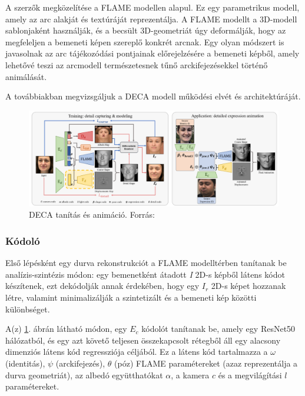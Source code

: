 \documentclass[12pt,a4]{article}
\begin{document}
            A szerzők megközelítése a FLAME modellen alapul. Ez egy parametrikus modell, amely az arc alakját és textúráját reprezentálja. A FLAME modellt a 3D-modell sablonjaként használják, és a becsült 3D-geometriát úgy deformálják, hogy az megfeleljen a bemeneti képen szereplő konkrét arcnak. Egy olyan módszert is javasolnak az arc tájékozódási pontjainak előrejelzésére a bemeneti képből, amely lehetővé teszi az arcmodell természetesnek tűnő arckifejezésekkel történő animálását.
    
        
     	      A továbbiakban megvizsgáljuk a DECA modell működési elvét és architektúráját.

            \begin{figure}[h]	
     		 \centering
     		 \includegraphics[width=1\linewidth]{deca}
     		 \caption{ DECA tanítás és animáció.
     			    Forrás:\cite{deca}}
                \label{fig:deca}
     	      \end{figure}

            \subsubsection{Kódoló} \label{Kódoló}
    	        Első lépésként egy durva rekonstrukciót a FLAME modelltérben \cite{flame}
                tanítanak be analízis-szintézis módon: egy bemenetként átadott \textit{I} 2D-s képből látens kódot készítenek, ezt dekódolják annak érdekében, hogy egy $I_{r}$ 2D-s képet hozzanak létre, valamint minimalizálják a szintetizált és a bemeneti kép közötti különbséget.
            
    	        A(z) \ref{fig:deca}. ábrán látható módon, egy $E_{c}$ kódolót tanítanak be, amely egy \cite{liwen}ResNet50 hálózatból, és egy azt követő teljesen összekapcsolt rétegből áll egy alacsony dimenziós látens kód regressziója céljából. Ez a látens kód tartalmazza a $\omega$ (identitás), $\psi$ (arckifejezés), $\theta$ (póz) \cite{flame}FLAME paramétereket (azaz reprezentálja a durva geometriát), az albedó együtthatókat $\alpha$, a kamera $c$ és a megvilágítási $l$ paramétereket.
    
\end{document}
